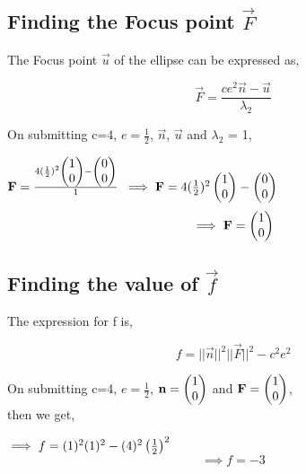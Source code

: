\documentclass[journal,10pt,twocolumn]{article}
\begin{document}
\begin{flushleft}
\subsection{Finding the Focus point $\vec{F}$}
\end{flushleft}
\vspace{0.25cm}
\begin{flushleft}
The Focus point $\vec{u}$  of the ellipse can be expressed as,\\
\vspace{0.25cm}
\end{flushleft}
\begin{equation}
    \vec{F} =\frac{ce^2\vec{n}-\vec{u}}{\lambda_2}
\end{equation}
\begin{flushleft}
On submitting c=4, $e=\frac{1}{2}$, $\vec{n}$, $\vec{u}$ and  $\lambda_2$ = 1,
\end{flushleft}
\center
 $ \mathbf{F} =\frac{4 (\frac{1}{2})^2\begin{pmatrix}1\\0\end{pmatrix}-\begin{pmatrix}0\\0\end{pmatrix}}{1}$
\endcenter
\center
 $ \implies \mathbf{F} =4 (\frac{1}{2})^2\begin{pmatrix}1\\0\end{pmatrix}-\begin{pmatrix}0\\0\end{pmatrix}$
\endcenter
\begin{equation}
\implies \mathbf{F}=\begin{pmatrix}1\\0\end{pmatrix}
\end{equation}
\begin{flushleft}
\subsection{Finding the value of $\vec{f}$ }
\end{flushleft}
\vspace{0.25cm}
\begin{flushleft}
The expression for f is,\\
\vspace{0.15cm}
\end{flushleft}
\begin{equation}
   f =||\vec{n}||^2 ||\vec{F}||^2-c^2e^2
\end{equation}
\begin{flushleft}
On submitting c=4, $e=\frac{1}{2}$, $\mathbf{n}=\begin{pmatrix}1\\0\end{pmatrix}$ and $\mathbf{F}=\begin{pmatrix}1\\0\end{pmatrix}$,\\ then we get,
\end{flushleft}
\center
$\implies f =(1)^2 (1)^2-(4)^2 \left(\frac{1}{2}\right)^2$
\begin{equation}
   \implies f= -3
\end{equation}
\endcenter
\end{document}
